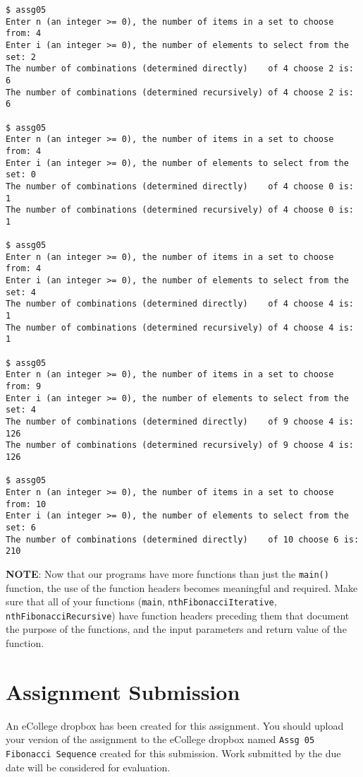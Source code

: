 \documentclass[11pt]{article}
\begin{document}
\begin{verbatim}
$ assg05 
Enter n (an integer >= 0), the number of items in a set to choose from: 4
Enter i (an integer >= 0), the number of elements to select from the set: 2
The number of combinations (determined directly)    of 4 choose 2 is: 6
The number of combinations (determined recursively) of 4 choose 2 is: 6

$ assg05 
Enter n (an integer >= 0), the number of items in a set to choose from: 4
Enter i (an integer >= 0), the number of elements to select from the set: 0
The number of combinations (determined directly)    of 4 choose 0 is: 1
The number of combinations (determined recursively) of 4 choose 0 is: 1

$ assg05 
Enter n (an integer >= 0), the number of items in a set to choose from: 4
Enter i (an integer >= 0), the number of elements to select from the set: 4
The number of combinations (determined directly)    of 4 choose 4 is: 1
The number of combinations (determined recursively) of 4 choose 4 is: 1

$ assg05 
Enter n (an integer >= 0), the number of items in a set to choose from: 9
Enter i (an integer >= 0), the number of elements to select from the set: 4
The number of combinations (determined directly)    of 9 choose 4 is: 126
The number of combinations (determined recursively) of 9 choose 4 is: 126

$ assg05 
Enter n (an integer >= 0), the number of items in a set to choose from: 10
Enter i (an integer >= 0), the number of elements to select from the set: 6
The number of combinations (determined directly)    of 10 choose 6 is: 210
\end{verbatim}


\textbf{NOTE}: Now that our programs have more functions than just the
\verb~main()~ function, the use of the function headers becomes meaningful
and required.  Make sure that all of your functions (\verb~main~,
\verb~nthFibonacciIterative~, \verb~nthFibonacciRecursive~) have function
headers preceding them that document the purpose of the functions, and
the input parameters and return value of the function.
\section*{Assignment Submission}
\label{sec-4}


An eCollege dropbox has been created for this assignment.  You should
upload your version of the assignment to the eCollege dropbox named
\verb~Assg 05 Fibonacci Sequence~ created for this submission.  Work
submitted by the due date will be considered for evaluation.
\end{document}
